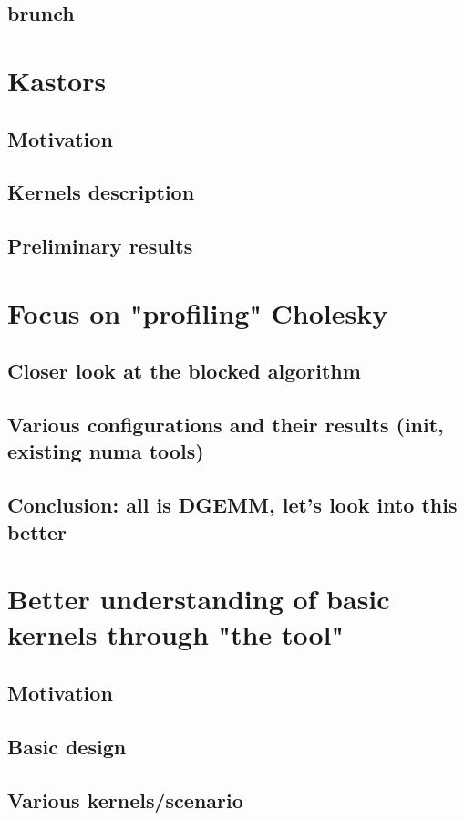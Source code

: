 \subsection{brunch}

\section{Kastors}
\subsection{Motivation}
\subsection{Kernels description}
\subsection{Preliminary results}

\section{Focus on "profiling" Cholesky}
\subsection{Closer look at the blocked algorithm}
\subsection{Various configurations and their results (init, existing numa tools)}
\subsection{Conclusion: all is DGEMM, let's look into this better}

\section{Better understanding of basic kernels through "the tool"}
\subsection{Motivation}
\subsection{Basic design}
\subsection{Various kernels/scenario}

